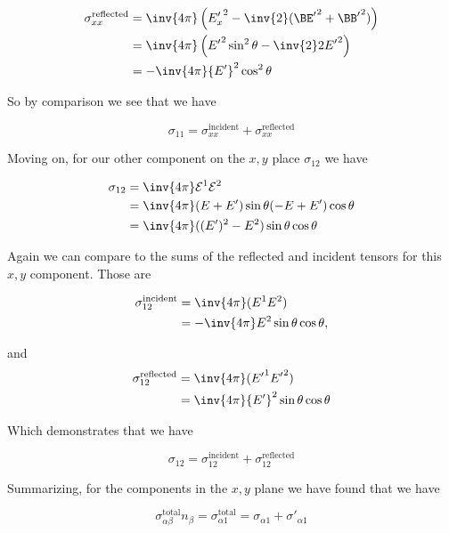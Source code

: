 \begin{align*}
{\sigma}_{x x}^{\text{reflected}} 
&= \inv{4 \pi} \left( 
{E_x'}^2 - \inv{2} ({\BE'}^2 + {\BB'}^2)
\right) \\
&= \inv{4 \pi} \left( 
{E'}^2 \sin^2 \theta - \inv{2} 2 {E'}^2 
\right) \\
&= -\inv{4 \pi} {E'}^2 \cos^2\theta
\end{align*}

So by comparison we see that we have

\begin{equation}\label{eqn:relativisticElectrodynamicsT9:n}
\sigma_{1 1} = {\sigma}_{x x}^{\text{incident}} +{\sigma}_{x x}^{\text{reflected}} 
\end{equation}

Moving on, for our other component on the $x,y$ place $\sigma_{12}$ we have

\begin{align*}
\sigma_{12} 
&= \inv{4 \pi} \mathcal{E}^1 \mathcal{E}^2 \\
&= \inv{4 \pi} (E + E') \sin\theta (-E + E') \cos\theta \\
&= \inv{4 \pi} ((E')^2 - E^2) \sin\theta \cos\theta 
\end{align*}

Again we can compare to the sums of the reflected and incident tensors for this $x,y$ component.  Those are

\begin{align*}
\sigma_{12}^{\text{incident}} 
&= 
\inv{4 \pi} ( E^1 E^2 ) \\
&= 
-\inv{4 \pi} E^2 \sin\theta \cos\theta,
\end{align*}

and
\begin{align*}
\sigma_{12}^{\text{reflected}} 
&= 
\inv{4 \pi} ( {E'}^1 {E'}^2 ) \\
&= 
\inv{4 \pi} {E'}^2 \sin\theta \cos\theta
\end{align*}

Which demonstrates that we have

\begin{equation}\label{eqn:relativisticElectrodynamicsT9:n}
\sigma_{12} = \sigma_{12}^{\text{incident}} + \sigma_{12}^{\text{reflected}} 
\end{equation}

Summarizing, for the components in the $x,y$ plane we have found that we have

\begin{equation}\label{eqn:relativisticElectrodynamicsT9:210}
\sigma_{\alpha\beta}^{\text{total}} n_\beta = \sigma_{\alpha 1 }^{\text{total}} = \sigma_{\alpha 1} + {\sigma'}_{\alpha 1}
\end{equation}

